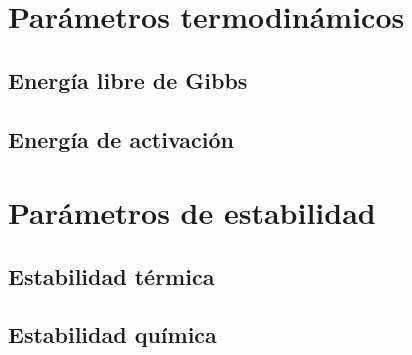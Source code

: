 


\section{Parámetros termodinámicos}



\subsection{Energía libre de Gibbs}



\subsection{Energía de activación}



\section{Parámetros de estabilidad}



\subsection{Estabilidad térmica}



\subsection{Estabilidad química}





\newpage \putbib